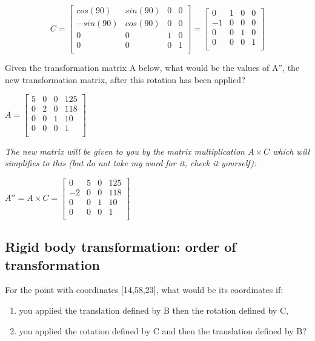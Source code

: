 \documentclass[a4paper,10pt]{article}
\begin{document}
\begin{displaymath}
C =
\left[\begin{array}{cccc}
  cos(90) 	& sin(90) 	& 0 	& 0\\ 
  -sin(90) 	& cos(90)	& 0 	& 0\\
  0 	& 0 	& 1 	& 0\\
  0 	& 0 	& 0 	& 1\\
\end{array}\right]
=
\left[\begin{array}{cccc}
  0 	& 1 	& 0 	& 0\\ 
  -1 	& 0	& 0 	& 0\\
  0 	& 0 	& 1 	& 0\\
  0 	& 0 	& 0 	& 1\\
\end{array}\right]
\end{displaymath}

\bigskip
Given the transformation matrix A below, what would be the values of A'', the new transformation matrix, after this rotation has been applied?

\bigskip
$ A=
\left[\begin{array}{cccc}
  5 	& 0 	& 0 	& 125\\ 
  0 	& 2 	& 0 	& 118\\
  0 	& 0 	& 1 	& 10\\
  0 	& 0 	& 0 	& 1\\
\end{array}\right] 
$

\bigskip
\textit{The new matrix will be given to you by the matrix multiplication $A \times C$ which will simplifies to this (but do not take my word for it, check it yourself):}

\bigskip
$ A'' = A \times C =
\left[\begin{array}{cccc}
  0 	& 5 	& 0 	& 125\\ 
  -2 	& 0 	& 0 	& 118\\
  0 	& 0 	& 1 	& 10\\
  0 	& 0 	& 0 	& 1\\
\end{array}\right] 
$

\subsection{Rigid body transformation: order of transformation}

For the point with coordinates [14,58,23], what would be its coordinates if:
\begin{enumerate}
  \item you applied the translation defined by B then the rotation defined by C,
  \item you applied the rotation defined by C and then the translation defined by B?
\end{enumerate}
\end{document}
